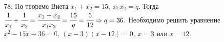 78. По теореме Виета $x_1+x_2=15,\ x_1x_2=q.$ Тогда $\cfrac{1}{x_1}+\cfrac{1}{x_2}=\cfrac{x_1+x_2}{x_1x_2}=\cfrac{15}{q}=\cfrac{5}{12}\Rightarrow q=36.$ Необходимо решить уравнение $x^2-15x+36=0,\ (x-3)(x-12)=0,\ x=3$ или $x=12.$\\
